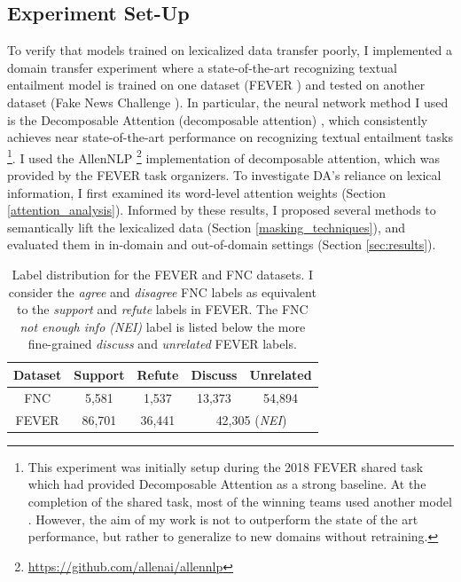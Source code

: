 \documentclass{article}
\begin{document}
\subsection{Experiment Set-Up}
 
To verify that models trained on lexicalized data transfer poorly, I implemented a domain transfer experiment where a state-of-the-art recognizing textual entailment model is trained on one dataset (FEVER \citep*{thorne2018fever}) and tested on another dataset (Fake News Challenge \citep*{pomerleau2017fake}). In particular, the neural network method I used is the Decomposable Attention (decomposable attention) \citep*{parikh2016decomposable}, which consistently achieves near state-of-the-art performance on recognizing textual entailment tasks \footnote{This experiment was initially setup during the 2018 FEVER shared task which had provided Decomposable Attention as a strong baseline. At the completion of the shared task, most of the winning teams used another model \citep*{chen2016enhanced}. However, the aim of my work is not to outperform the state of the art performance, but rather to generalize to new domains without retraining.}.  I used the AllenNLP \footnote{\url{https://github.com/allenai/allennlp}}
implementation of decomposable attention, which was provided by the FEVER task organizers. To investigate DA's reliance on lexical information, I first examined its word-level attention weights (Section \ref{attention_analysis}). 
Informed by these results, I proposed several methods to semantically lift the lexicalized data (Section \ref{masking_techniques}), and evaluated them in in-domain and  out-of-domain settings (Section \ref{sec:results}).




\begin{table}[t]
    \centering
    \footnotesize
    \begin{tabular}{ccccc}
        Dataset & Support & Refute & Discuss & Unrelated \\
        \hline
        FNC    & 5,581 & 1,537  & 13,373 & 54,894 \\
        FEVER  &  86,701 & 36,441  & \multicolumn{2}{c}{42,305 (\textit{NEI})} \\  
    \end{tabular}
    \caption{Label distribution for the FEVER and FNC datasets.  I consider the \textit{agree} and \textit{disagree} FNC labels as equivalent to the \textit{support} and \textit{refute} labels in FEVER. The FNC \textit{not enough info (NEI)} label is listed below the more fine-grained \textit{discuss} and \textit{unrelated} FEVER labels.  }
    \label{tab:data}
\end{table}
\end{document}
